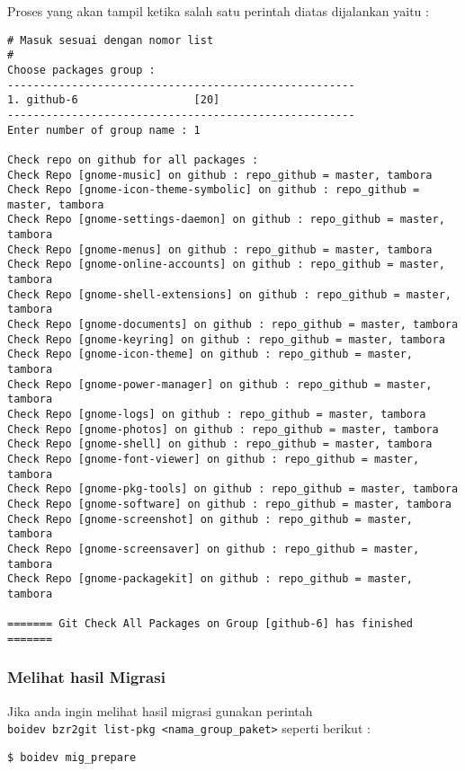 {\noindent
Proses yang akan tampil ketika salah satu perintah diatas dijalankan yaitu :

\begin{lstlisting}[language=ShellBash2]
# Masuk sesuai dengan nomor list
#
Choose packages group : 
------------------------------------------------------
1. github-6                  [20]
------------------------------------------------------
Enter number of group name : 1

Check repo on github for all packages : 
Check Repo [gnome-music] on github : repo_github = master, tambora 
Check Repo [gnome-icon-theme-symbolic] on github : repo_github = master, tambora 
Check Repo [gnome-settings-daemon] on github : repo_github = master, tambora 
Check Repo [gnome-menus] on github : repo_github = master, tambora 
Check Repo [gnome-online-accounts] on github : repo_github = master, tambora 
Check Repo [gnome-shell-extensions] on github : repo_github = master, tambora 
Check Repo [gnome-documents] on github : repo_github = master, tambora 
Check Repo [gnome-keyring] on github : repo_github = master, tambora 
Check Repo [gnome-icon-theme] on github : repo_github = master, tambora 
Check Repo [gnome-power-manager] on github : repo_github = master, tambora 
Check Repo [gnome-logs] on github : repo_github = master, tambora 
Check Repo [gnome-photos] on github : repo_github = master, tambora 
Check Repo [gnome-shell] on github : repo_github = master, tambora 
Check Repo [gnome-font-viewer] on github : repo_github = master, tambora 
Check Repo [gnome-pkg-tools] on github : repo_github = master, tambora 
Check Repo [gnome-software] on github : repo_github = master, tambora 
Check Repo [gnome-screenshot] on github : repo_github = master, tambora 
Check Repo [gnome-screensaver] on github : repo_github = master, tambora 
Check Repo [gnome-packagekit] on github : repo_github = master, tambora 

======= Git Check All Packages on Group [github-6] has finished =======
\end{lstlisting}

\subsubsection{Melihat hasil Migrasi}
\noindent
Jika anda ingin melihat hasil migrasi gunakan perintah\\ {\small \texttt{boidev bzr2git list-pkg <nama\_group\_paket>}} seperti berikut :

\begin{lstlisting}[language=ShellBash]
$ boidev mig_prepare
\end{lstlisting}

}
